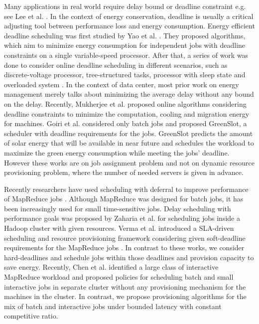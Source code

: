 \documentclass[10pt,conference,compsocconf,letterpaper]{IEEEtran}
\begin{document}
Many applications in real world require delay bound or deadline constraint e.g. see Lee et al. \cite{24}. In the context of energy conservation, deadline is usually a critical adjusting tool between performance loss and energy consumption. Energy efficient deadline scheduling was first studied by Yao et al. \cite{10}. They proposed algorithms, which aim to minimize energy consumption for independent jobs with deadline constraints on a single variable-speed processor. After that, a series of work was done to consider online deadline scheduling in different scenarios, such as discrete-voltage processor, tree-structured tasks, processor with sleep state and overloaded system \cite{11,12}. In the context of data center, most prior work on energy management merely talks about minimizing the average delay without any bound on the delay. Recently, Mukherjee et al. \cite{17} proposed online algorithms considering deadline constraints to minimize the computation, cooling and migration energy for machines.  Goiri et al. \cite{Goiri} considered only batch jobs and proposed GreenSlot, a scheduler with deadline requirements for the jobs. GreenSlot predicts the amount of solar energy that will be available in near future and schedules the workload to maximize the green energy consumption while meeting the jobs' deadline. However these works are on job assignment problem and not on dynamic resource provisioning problem, where the number of needed servers is given in advance.





Recently researchers have used scheduling with deferral to improve performance of MapReduce jobs \cite{n6,n11}. Although MapReduce was designed for batch jobs, it has been increasingly used for small time-sensitive jobs. Delay scheduling with performance goals was proposed by Zaharia et al. \cite{n6} for scheduling jobs inside a Hadoop cluster with given resources. Verma et al. introduced a SLA-driven scheduling and resource provisioning framework considering given soft-deadline requirements for the MapReduce jobs \cite{n9,n10}. In contrast to these works, we consider hard-deadlines and schedule jobs within those deadlines and provision capacity to save energy.
Recently, Chen et al. \cite{n5} identified a large class of interactive MapReduce workload and proposed policies for scheduling batch and small interactive jobs in separate cluster without any provisioning mechanism for the machines in the cluster. In contrast, we propose provisioning algorithms for the mix of batch and interactive jobs under bounded latency with constant competitive ratio.
\end{document}

